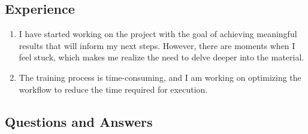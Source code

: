 \subsection*{Experience}

\begin{enumerate}
    \item I have started working on the project with the goal of achieving meaningful results that will inform my next steps. However, there are moments when I feel stuck, which makes me realize the need to delve deeper into the material.
    
    \item The training process is time-consuming, and I am working on optimizing the workflow to reduce the time required for execution.
\end{enumerate}

\subsection*{Questions and Answers}

